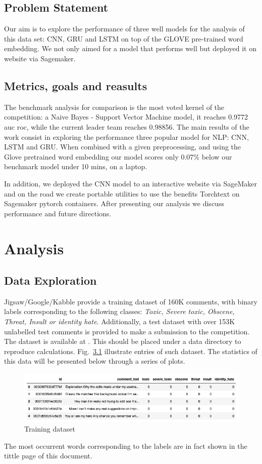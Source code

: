 \documentclass{report}
\begin{document}
\section{Problem Statement}

Our aim is to explore the performance of three well models for the analysis of
this data set: CNN, GRU and LSTM on top of the GLOVE pre-trained word embedding. 
We not only aimed for a model that performs well but deployed it on website via Sagemaker.

\section{Metrics, goals and reasults}

The benchmark analysis for comparison is the most voted
kernel of the competition: a Naive Bayes - Support Vector Machine model, it reaches 0.9772 auc roc,
while the current leader team reaches 0.98856. The main 
results of the work consist in exploring the performance three popular model for NLP:  CNN, LSTM and GRU.
When combined with a given preprocessing, and using the Glove pretrained word embedding our model 
scores only 0.07\% below 
our benchmark model under 10 mins, on a laptop.

In addition, we deployed the CNN model to an interactive website via SageMaker and on the road 
we create portable utilities to use the benefits Torchtext on Sagemaker pytorch containers. 
After presenting our analysis we discuss performance and future directions. 


\chapter{Analysis}


\section{Data Exploration}

 Jigsaw/Google/Kabble provide a training dataset  of 160K comments, with binary labels
 corresponding to the following classes:
 \emph{Toxic, Severe toxic, Obscene, Threat, Insult or  identity hate}.
 Additionally, a test dataset  with over 153K unlabelled  test comments is provided to make 
 a submission to the competition. The dataset is available at \cite{Kaggle}. This should be placed under a data
 directory to reproduce calculations. Fig.~\ref{fig:train_head} illustrate entries of 
 such dataset. The statistics of this data will be presented below through a series of plots. 
\begin{figure}[!h]
\centering
  \includegraphics[width=140mm]{../local/plots_tables/train_head.png}
  \caption{Training dataset}
  \label{fig:train_head}
\end{figure}
The most occurrent words corresponding to the labels are in fact shown in the tittle page of this document.
\end{document}
